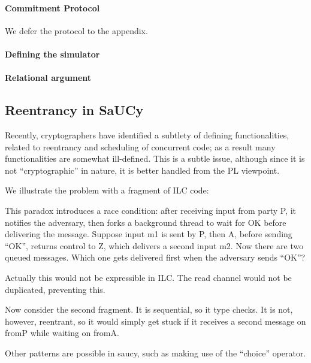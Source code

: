\paragraph{Commitment Protocol}
We defer the protocol to the appendix.

\paragraph{Defining the simulator}

\paragraph{Relational argument}

\subsection{Reentrancy in SaUCy}
\label{subsec:reentrancy}

Recently, cryptographers have identified a subtlety of defining functionalities, related to reentrancy and scheduling of concurrent code; as a result many functionalities are somewhat ill-defined.
This is a subtle issue, although since it is not ``cryptographic'' in nature, it is better handled from the PL viewpoint.

We illustrate the problem with a fragment of ILC code:

This paradox introduces a race condition: after receiving input from party P, it notifies the adversary, then forks a background thread to wait for OK before delivering the message. Suppose input m1 is sent by P, then A, before sending “OK”, returns control to Z, which delivers a second input m2. Now there are two queued messages. Which one gets delivered first when the adversary sends “OK”?

Actually this would not be expressible in ILC. The read channel would not be duplicated, preventing this.


Now consider the second fragment.
It is sequential, so it type checks. It is not, however, reentrant, so it would simply get stuck if it receives a second message on fromP while waiting on fromA.

Other patterns are possible in saucy, such as making use of the ``choice'' operator.
